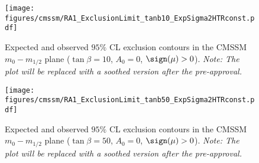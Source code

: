 \begin{figure}[h]
   \begin{center}
    \texttt{[image: figures/cmssm/RA1\_ExclusionLimit\_tanb10\_ExpSigma2HTRconst.pdf]} 
 \caption{\label{fig:tanb10} Expected and observed $95\%$ CL exclusion contours in the 
CMSSM $m_0 - m_{1/2}$ plane ($\tan \beta = 10$, $A_0 = 0$, $\sign(\mu)>0$). {\it Note: The plot will be replaced with a soothed version after the pre-approval.}} 
\end{center}
\end{figure}


\begin{figure}[h]
   \begin{center}
    \texttt{[image: figures/cmssm/RA1\_ExclusionLimit\_tanb50\_ExpSigma2HTRconst.pdf]} 
 \caption{\label{fig:tanb50} Expected and observed $95\%$ CL exclusion contours in the 
CMSSM $m_0 - m_{1/2}$ plane ($\tan \beta = 50$, $A_0 = 0$, $\sign(\mu)>0$). {\it Note: The plot will be replaced with a soothed version after the pre-approval.}} 
\end{center}
\end{figure}

